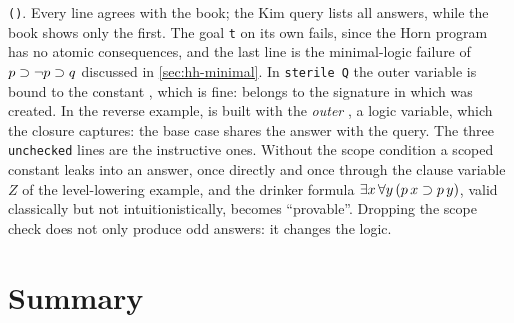 {{\texttt{()}. Every line agrees with the book; the Kim query lists all answers, while the book shows only
the first. The goal \texttt{t} on its own fails, since the Horn program has no atomic consequences, and the
last line is the minimal-logic failure of $p\supset\neg p\supset q$ discussed in \cref{sec:hh-minimal}. In \texttt{sterile Q} the outer variable is bound to the constant , which is fine: 
belongs to the signature in which  was created. In the reverse example,  is built
with the \emph{outer} , a logic variable, which the closure captures: the base case shares the
answer with the query. The three \texttt{unchecked} lines are the instructive ones. Without the scope
condition a scoped constant leaks into an answer, once directly and once through the clause variable $Z$ of
the level-lowering example, and the drinker formula $\exists x\,\forall y\,(p\,x\supset p\,y)$, valid
classically but not intuitionistically, becomes ``provable''. Dropping the scope check does not only produce
odd answers: it changes the logic.

\section{Summary}\label{sec:hh-summary}

}}
